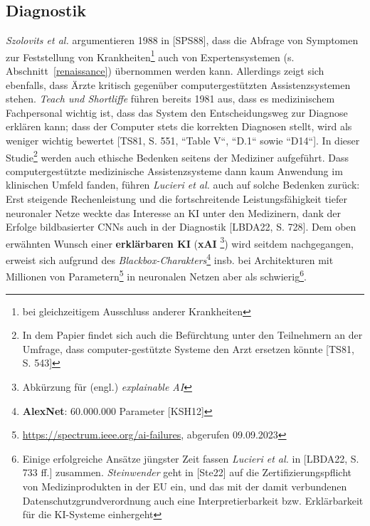 \subsection{Diagnostik}
\textit{Szolovits et al.} argumentieren 1988 in [SPS88], dass die Abfrage von Symptomen zur Feststellung von Krankheiten\footnote{
    bei gleichzeitigem Ausschluss anderer Krankheiten
} auch von Expertensystemen (s. Abschnitt~\ref{renaissance}) übernommen werden kann. Allerdings zeigt sich ebenfalls, dass Ärzte kritisch gegenüber computergestützten Assistenzsystemen stehen. \textit{Teach und Shortliffe} führen bereits 1981 aus, dass es medizinischem Fachpersonal wichtig ist, dass das System den Entscheidungsweg zur Diagnose erklären kann; dass der Computer stets die korrekten Diagnosen stellt, wird als weniger wichtig bewertet [TS81, S. 551, ``Table V``, ``D.1`` sowie ``D14``]. In dieser Studie\footnote{
    In dem Papier findet sich auch die Befürchtung unter den Teilnehmern an der Umfrage, dass computer-gestützte Systeme den Arzt ersetzen könnte [TS81, S. 543]
} werden auch ethische Bedenken seitens der Mediziner aufgeführt. Dass computergestützte medizinische Assistenzsysteme dann kaum Anwendung im klinischen Umfeld fanden, führen \textit{Lucieri et al.} auch auf solche Bedenken zurück: Erst steigende Rechenleistung und die fortschreitende Leistungsfähigkeit tiefer neuronaler Netze weckte das Interesse an KI unter den Medizinern, dank der Erfolge bildbasierter CNNs auch in der Diagnostik [LBDA22, S. 728]. Dem oben erwähnten Wunsch einer \textbf{erklärbaren KI} (\textbf{xAI} \footnote{
    Abkürzung für (engl.) \textit{explainable AI}
}) wird seitdem nachgegangen, erweist sich aufgrund des \textit{Blackbox-Charakters}\footnote{
    \textbf{AlexNet}: 60.000.000 Parameter [KSH12]
} insb. bei Architekturen mit Millionen von Parametern\footnote{
    \url{https://spectrum.ieee.org/ai-failures}, abgerufen 09.09.2023
} in neuronalen Netzen aber als schwierig\footnote{
    Einige erfolgreiche Ansätze jüngster Zeit fassen \textit{Lucieri et al.} in [LBDA22, S. 733 ff.] zusammen. \textit{Steinwender} geht in [Ste22] auf die Zertifizierungspflicht von Medizinprodukten in der EU ein, und das mit der damit verbundenen Datenschutzgrundverordnung auch eine Interpretierbarkeit bzw. Erklärbarkeit für die KI-Systeme einhergeht
}.
